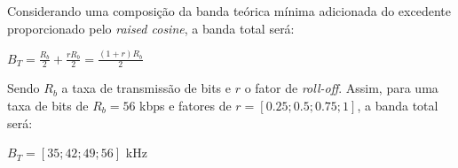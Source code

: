 Considerando uma composição da banda teórica mínima adicionada do excedente proporcionado pelo \textit{raised cosine}, a banda total será:

\begin{center}
    $B_T = \frac{R_b}{2} + \frac{rR_b}{2} = \frac{(1+r)R_b}{2}$
\end{center}

Sendo $R_b$ a taxa de transmissão de bits e $r$ o fator de \textit{roll-off}. Assim, para uma taxa de bits de $R_b = 56$ kbps e fatores de $r = [0.25; 0.5; 0.75; 1]$, a banda total será:

\begin{center}
    $B_T = [35; 42; 49; 56]$ kHz
\end{center}

\newpage
